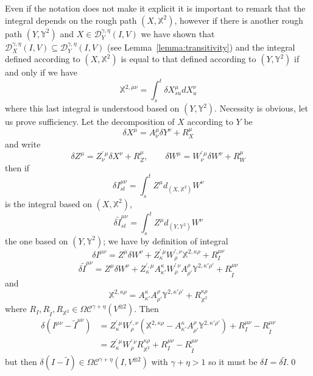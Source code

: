 \documentclass[a4paper,12pt,reqno]{amsproc}
\newcommand{\der}{\delta\!}
\newcommand{\DD}{\mathcal{D}}
\newcommand{\OCC}{\Omega \mathcal{C}}
\begin{document}
Even if the notation does not make it explicit it is important to
remark that the integral depends on the rough path $(X,\mathbb{X}^2)$,
however if there is another rough path  $(Y,\mathbb{Y}^2)$ and $X \in \DD_Y^{\gamma,\eta}(I,V)$  we have shown that
$\DD_X^{\gamma,\eta}(I,V)\subseteq \DD_Y^{\gamma,\eta}(I,V)$ (see
Lemma~\ref{lemma:transitivity}) and the integral
defined according to  $(X,\mathbb{X}^2)$ is equal to that defined
according to $(Y,\mathbb{Y}^2)$ if and only if we have
\begin{equation*}
  \mathbb{X}^{2,\mu\nu} = \int_s^t \der X^\mu_{su} dX^\nu_u
\end{equation*}
where this last integral is understood based on $(Y,\mathbb{Y}^2)$.
Necessity is obvious, let us prove sufficiency.
Let the decomposition of $X$ according to $Y$ be
$$
\der X^\mu = A^{\mu}_{\nu} \der Y^\nu + R^\mu_X
$$
and write
$$
\der Z^\mu = Z^{\prime\,\mu}_{\nu} \der X^\nu + R^\mu_Z, 
\qquad \der W^\mu = W^{\prime\,\mu}_{\nu} \der W^\nu + R^\mu_W
$$
then if 
$$
\der I^{\mu\nu}_{st} = \int_s^t Z^\mu d_{(X,\mathbb{X}^2)}W^\nu
$$
is the integral based on $(X,\mathbb{X}^2)$,
$$
\der \widetilde I^{\mu\nu}_{st} = \int_s^t Z^\mu d_{(Y,\mathbb{Y}^2)}W^\nu
$$
the one based on $(Y,\mathbb{Y}^2)$; we have by definition of integral
$$
\der I^{\mu\nu} = Z^{\mu} \der W^\nu + Z^{\prime\,\mu}_{\kappa}
W^{\prime,\nu}_{ \rho} \mathbb{X}^{2,\kappa\rho} + R^{\mu\nu}_I
$$
$$
\der \widetilde I^{\mu\nu} = Z^{\mu} \der W^\nu + Z^{\prime,\mu}_{\kappa}
A^{\kappa}_{\kappa'} W^{\prime\,\nu}_{\rho} A^{\rho}_{\rho'} \mathbb{Y}^{2,\kappa'\rho'} + R^{\mu\nu}_{\widetilde I}
$$
and
$$
\mathbb{X}^{2,\kappa\rho} = A^{\kappa}_{\kappa'} A^{\rho}_{\rho'} \mathbb{Y}^{2,\kappa'\rho'} + R^{\kappa\rho}_{\mathbb{X}^2}
$$
where $R_I, R_{\widetilde I}, R_{\mathbb{X}^2} \in \OCC^{\gamma+\eta}(V^{\otimes 2})$.
Then
\begin{equation*}
  \begin{split}
\der (I^{\mu\nu}-\widetilde I^{\mu\nu}) & = Z^{\prime\,\mu}_{\kappa} W^{\prime,\nu}_{\rho} (\mathbb{X}^{2,\kappa\rho}-A^{\kappa}_{\kappa'} A^{\rho}_{\rho'} \mathbb{Y}^{2,\kappa'\rho'}) + R^{\mu\nu}_I -
R^{\mu\nu}_{\widetilde I}    
\\ & = Z^{\prime\,\mu}_{\kappa} W^{\prime\,\nu}_{\rho}
R_{\mathbb{X}^2}^{\kappa\rho} + R^{\mu\nu}_I - R^{\mu\nu}_{\widetilde I}    
  \end{split}
\end{equation*}
but then $\der(I -\widetilde I) \in \OCC^{\gamma+\eta}(I,V^{\otimes 2})$ with
$\gamma+\eta > 1$ so it must be $\der I = \der \widetilde I$.\qed
\end{document}
